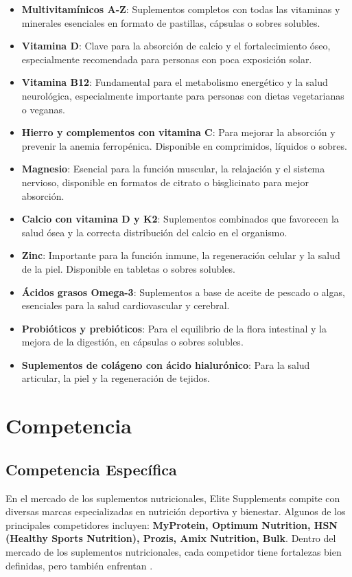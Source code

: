 \documentclass[11pt,a4paper]{report}
\begin{document}
\begin{itemize}
    \item \textbf{Multivitamínicos A-Z}: Suplementos completos con todas las vitaminas y minerales esenciales en formato de pastillas, cápsulas o sobres solubles.  
    \item \textbf{Vitamina D}: Clave para la absorción de calcio y el fortalecimiento óseo, especialmente recomendada para personas con poca exposición solar.  
    \item \textbf{Vitamina B12}: Fundamental para el metabolismo energético y la salud neurológica, especialmente importante para personas con dietas vegetarianas o veganas.  
    \item \textbf{Hierro y complementos con vitamina C}: Para mejorar la absorción y prevenir la anemia ferropénica. Disponible en comprimidos, líquidos o sobres.  
    \item \textbf{Magnesio}: Esencial para la función muscular, la relajación y el sistema nervioso, disponible en formatos de citrato o bisglicinato para mejor absorción.  
    \item \textbf{Calcio con vitamina D y K2}: Suplementos combinados que favorecen la salud ósea y la correcta distribución del calcio en el organismo.  
    \item \textbf{Zinc}: Importante para la función inmune, la regeneración celular y la salud de la piel. Disponible en tabletas o sobres solubles.  
    \item \textbf{Ácidos grasos Omega-3}: Suplementos a base de aceite de pescado o algas, esenciales para la salud cardiovascular y cerebral.  
    \item \textbf{Probióticos y prebióticos}: Para el equilibrio de la flora intestinal y la mejora de la digestión, en cápsulas o sobres solubles.  
    \item \textbf{Suplementos de colágeno con ácido hialurónico}: Para la salud articular, la piel y la regeneración de tejidos.  
\end{itemize}



\section{Competencia}
\subsection{Competencia Específica}

En el mercado de los suplementos nutricionales, Elite Supplements compite con diversas marcas especializadas en nutrición deportiva y bienestar. Algunos de los principales competidores incluyen: \textbf{MyProtein, Optimum Nutrition, HSN (Healthy Sports Nutrition), Prozis, Amix Nutrition, Bulk}. Dentro del mercado de los suplementos nutricionales, cada competidor tiene fortalezas bien definidas, pero también enfrentan .
\end{document}
